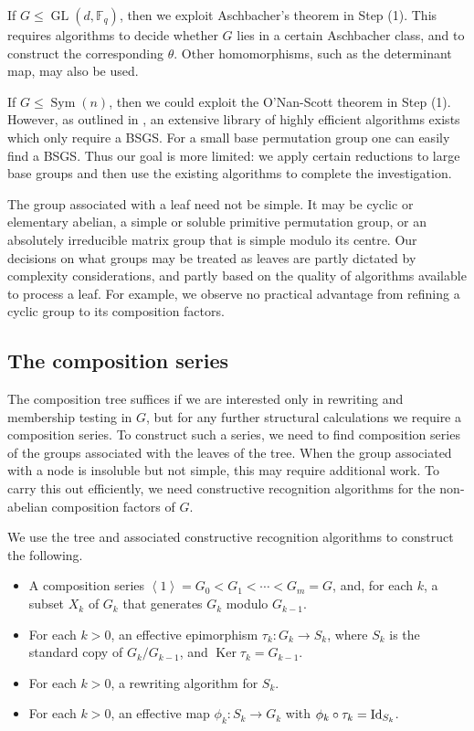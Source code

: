 \documentclass[12pt,twoside,reqno,psamsfonts]{amsproc}
\newcommand{\comment}[1]{\marginpar{\begin{center}\scriptsize{#1}\end{center}}}
\numberwithin{equation}{section}
\numberwithin{figure}{section}
\newcounter{algorithm}
\theoremstyle{plain}
\theoremstyle{definition}
\theoremstyle{remark}
\providecommand{\gen}[1]{\left\langle #1 \right\rangle}
\providecommand{\Sym}[1]{\operatorname{Sym}( #1 )}
\newcommand{\field}[1]{\mathbb{#1}}
\newcommand{\F}{\field{F}}
\DeclareMathOperator{\GL}{GL}
\DeclareMathOperator{\Ker}{Ker}
\begin{document}
If $G \leqslant \GL(d, \F_q)$, then we exploit Aschbacher's 
theorem \cite{aschbacher84} in Step (1).
This requires algorithms to decide whether $G$ lies in a
certain Aschbacher class, and to construct the corresponding $\theta$.
Other homomorphisms, such as the determinant map, may also be used.

If $G \leqslant \Sym{n}$, then we could exploit the 
O'Nan-Scott theorem \cite[Chapter 10]{hcgt} in Step (1).
However, as outlined in \cite[Chapter 6]{seress03},
an extensive library of highly efficient algorithms exists which 
only require a BSGS.
For a small base permutation group one can easily find a BSGS.
Thus our goal is more limited: we apply certain reductions to
large base groups and then use the existing %
algorithms to complete the investigation.

The group associated with a leaf need not be simple.
It may be cyclic or elementary abelian,
a simple or soluble primitive permutation group, or an absolutely 
irreducible matrix group that is simple modulo its centre.
Our decisions on what groups may be treated as leaves are 
partly dictated by complexity considerations, 
and partly based on the quality of algorithms
available to process a leaf. For example, we observe no practical
advantage from refining a cyclic group to 
its composition factors.

\subsection{The composition series}
\label{subsection:rearrange_interface}
The composition tree suffices if we are interested only in 
rewriting and membership testing in $G$, but for any further structural
calculations we require a composition series.
\comment{DFH: rearranged and expanded slightly}
To construct such a series, we need to find composition series of the groups
associated with the leaves of the tree.
When the group associated with a node is insoluble but not simple,
this may require additional work.  To carry this out efficiently,
we need constructive recognition algorithms for
the non-abelian composition factors of $G$.

We use the tree and associated constructive recognition
algorithms to construct the following.
\begin{itemize}
\item A composition series $\gen{1} = G_0 < G_1 < \dotsm < G_m = G$,
and, for each $k$, a subset $X_k$ of $G_k$ that 
generates $G_k$ modulo $G_{k-1}$.

\item For each $k > 0$, an effective epimorphism $\tau_k : G_k \to S_k$,
  where $S_k$ is the standard copy of $G_k / G_{k - 1}$,
  and $\Ker \tau_k  = G_{k - 1}$.
\item For each $k > 0$, a rewriting algorithm for $S_k$.

\item For each $k > 0$, an effective map $\phi_k:S_k \to G_k$ with
$\phi_k \circ \tau_k = {\rm Id}_{S_k}$.
\end{itemize}
\end{document}
